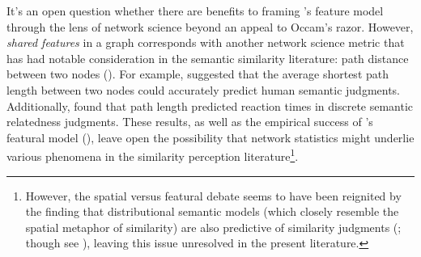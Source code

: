 \documentclass[12pt]{article}
\let\oldcite=\cite
\let\oldtextcite=\textcite
\renewcommand{\cite}[1]{\textcolor[rgb]{0, .121, .388}{\oldcite{#1}}}
\renewcommand{\textcite}[1]{\textcolor[rgb]{0, .121, .388}{\oldtextcite{#1}}}
\begin{document}
It's an open question whether there are benefits to framing \textcite{tversky1977features}'s feature model through the lens of network science beyond an appeal to Occam's razor. However, \emph{shared features} in a graph corresponds with another network science metric that has had notable consideration in the semantic similarity literature: path distance between two nodes (\cite{collins1975spreading,rada1989development,lee1993information,kenett2017semantic}). For example, \textcite{rada1989development} suggested that the average shortest path length between two nodes could accurately predict human semantic judgments. Additionally, \textcite{kenett2017semantic} found that path length predicted reaction times in discrete semantic relatedness judgments. These results, as well as the empirical success of \textcite{tversky1977features}'s featural model (\cite{tversky1982similarity}), leave open the possibility that network statistics might underlie various phenomena in the similarity perception literature\footnote{However, the spatial versus featural debate seems to have been reignited by the finding that distributional semantic models (which closely resemble the spatial metaphor of similarity) are also predictive of similarity judgments (\cite{bhatia2019distributed,gunther2016latent}; though see \cite{de2016predicting}), leaving this issue unresolved in the present literature.}.
\end{document}
